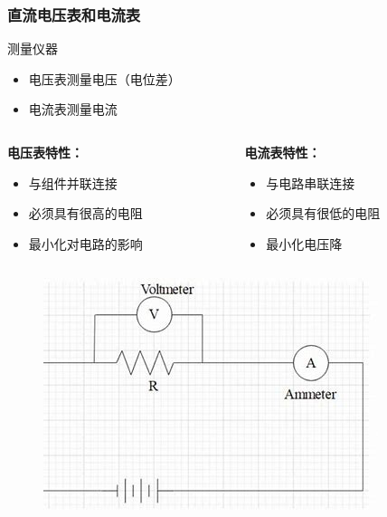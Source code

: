 \documentclass{beamer}
\begin{document}
\begin{frame}
    \frametitle{直流电压表和电流表}
    \begin{block}{测量仪器}
        \begin{itemize}
            \item 电压表测量电压（电位差）
            \item 电流表测量电流
        \end{itemize}
    \end{block}
    \begin{columns}
        \begin{column}{0.5\textwidth}
            \textbf{电压表特性：}
            \begin{itemize}
                \item 与组件并联连接
                \item 必须具有很高的电阻
                \item 最小化对电路的影响
            \end{itemize}
        \end{column}
        \begin{column}{0.5\textwidth}
            \textbf{电流表特性：}
            \begin{itemize}
                \item 与电路串联连接
                \item 必须具有很低的电阻
                \item 最小化电压降
            \end{itemize}
        \end{column}
    \end{columns}
    \begin{figure}
        \centering
        \includegraphics[width=0.3\linewidth]{amvolmm.jpg}
    \end{figure}
\end{frame}
\end{document}
